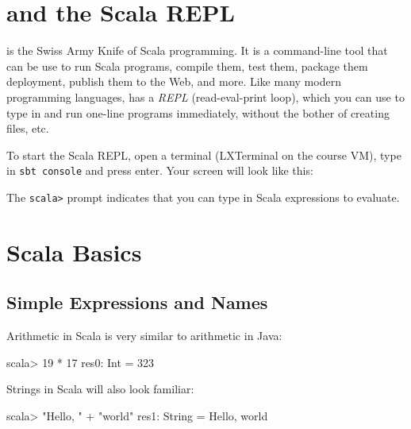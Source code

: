 \documentclass{book}
\begin{document}
\section{\sbt{} and the Scala REPL}

\sbt{} is the Swiss Army Knife of Scala programming. It is a command-line tool
that can be use to run Scala programs, compile them, test them, package them
deployment, publish them to the Web, and more. Like many modern programming
languages, \sbt{} has a \emph{REPL} (read-eval-print loop), which you can use to
type in and run one-line programs immediately, without the bother of creating
files, etc.

To start the Scala REPL, open a terminal (LXTerminal on the course VM),
type in \verb|sbt console| and press enter. Your screen will look like this:
%

The \verb|scala>| prompt indicates that you can type in Scala expressions to evaluate.

\section{Scala Basics}

\subsection{Simple Expressions and Names}

Arithmetic in Scala is very similar to arithmetic in Java:

\begin{console}
scala> 19 * 17
res0: Int = 323
\end{console}

Strings in Scala will also look familiar:

\begin{console}
scala> "Hello, " + "world"
res1: String = Hello, world
\end{console}
\end{document}
